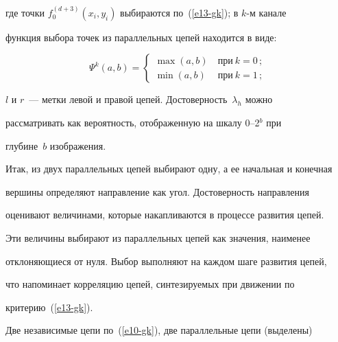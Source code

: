 где точки $f_0^{(d+3)}(x_i,y_i)$ выбираются по~(\ref{e13-gk}); в $k$-м канале 


функция выбора точек из параллельных цепей находится в виде:





\vspace*{3pt}





\noindent


$$


\Psi^k(a,b) =\begin{cases}


\max (a,b) &\ \mbox{при}\ k=0\,;\\


\min (a,b) &\ \mbox{при}\ k=1\,;


\end{cases}


$$





\vspace*{-3pt}





\noindent


$l$ и $r$~---  метки левой и правой цепей. Достоверность~$\lambda_h$ можно 


рассматривать как вероятность, отображенную на шкалу 0--2$^b$ при 


глубине~$b$ изображения.





  Итак, из двух параллельных цепей выбирают одну, а ее начальная и конечная 


вершины определяют направление как угол. Достоверность направления 


оценивают величинами, которые накапливаются в процессе развития цепей. 


Эти величины выбирают из параллельных цепей как значения, наименее 


отклоняющиеся от нуля. Выбор выполняют на каждом шаге развития цепей, 


что напоминает корреляцию цепей, синтезируемых при движении по 


критерию~(\ref{e13-gk}).


  


  Две независимые цепи по~(\ref{e10-gk}), две параллельные цепи (выделены) 


